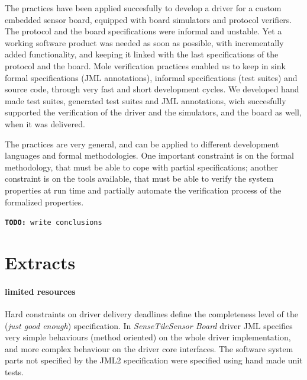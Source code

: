 \documentclass[english]{lni}
\newcommand{\todo}[1]{\texttt{\textbf{TODO:} #1}}
\newcommand{\ST}{\emph{SenseTile}\xspace}
\newcommand{\SB}{\emph{Sensor Board}\xspace}
\newcommand{\STSB}{\ST \SB\xspace}
\begin{document}
The practices have been applied succesfully to develop a driver for a custom embedded sensor board, equipped with board simulators and protocol verifiers. 
The protocol and the board specifications were informal and unstable. 
Yet a working software product was needed as soon as possible, with incrementally added functionality, and keeping it linked with the last specifications of the protocol and the board.
Mole verification practices enabled us to keep in sink formal specifications (JML annotations), informal specifications (test suites) and source code, through very fast and short development cycles.
We developed hand made test suites, generated test suites and JML annotations, wich succesfully supported the verification of the driver and the simulators, and the board as well, when it was delivered.

The practices are very general, and can be applied to different development languages and formal methodologies.
One important constraint is on the formal methodology, that must be able to cope with partial specifications; another constraint is on the tools available, that must be able to verify the system properties at run time and partially automate the verification process of the formalized properties.





\todo{write conclusions}

% 
% 


\newpage 

\section{Extracts}

\paragraph*{limited resources}

Hard constraints on driver delivery deadlines define the completeness level of the (\emph{just good enough}) specification.  
In \STSB driver JML specifies very simple behaviours (method oriented) on the whole driver implementation, and more complex behaviour on the driver core interfaces.  
The software system parts not specified by the JML2 specification were specified using hand made unit tests.
\end{document}
